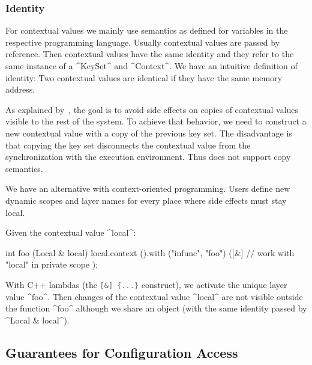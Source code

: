 \subsubsection{Identity}
\label{sec:identity}

For contextual values we mainly use semantics as defined for variables in the respective programming language.
Usually contextual values are passed by reference.
Then contextual values have the same identity and they refer to the same instance of a ^KeySet^ and ^Context^.
We have an intuitive definition of identity:
Two contextual values are identical if they have the same memory address.

As explained by~\citet{tanter2008contextvalues}, the goal is to avoid side effects on copies of contextual values visible to the rest of the system.
To achieve that behavior, we need to construct a new contextual value with a copy of the previous key set.
The disadvantage is that copying the key set disconnects the contextual value from the synchronization with the execution environment.
Thus \elektra{} does not support copy semantics.

We have an alternative with context-oriented programming.
Users define new dynamic scopes and layer names for every place where side effects must stay local.

\begin{example}
Given the contextual value ^local^:

int foo (Local & local)
{
	local.context ().with ("infunc", "foo") ([&] {
		// work with "local" in private scope
	});
}
\end{code}

With C++ lambdas (the \lstinline[language=Cpp]^[&] {...}^ construct), we activate the unique layer value ^foo^.
Then changes of the contextual value ^local^ are not visible outside the function ^foo^ although we share an object (with the same identity passed by ^Local & local^).
\end{example}



\subsection{Guarantees for Configuration Access}
\label{sec:approach-guarantees}

